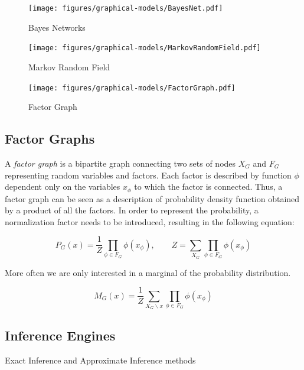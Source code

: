 \begin{figure}[ht]
    \begin{minipage}[b]{0.3\linewidth}
        \centering
        \texttt{[image: figures/graphical-models/BayesNet.pdf]}
        \caption{Bayes Networks}
    \end{minipage}
    \hspace{0.5cm}
    \begin{minipage}[b]{0.3\linewidth}
        \centering
        \texttt{[image: figures/graphical-models/MarkovRandomField.pdf]}
        \caption{Markov Random Field}
    \end{minipage}
    \hspace{0.5cm}
    \begin{minipage}[b]{0.3\linewidth}
        \centering
        \texttt{[image: figures/graphical-models/FactorGraph.pdf]}
        \caption{Factor Graph}
    \end{minipage}
\end{figure}

\subsection{Factor Graphs}
A \emph{factor graph} is a bipartite graph connecting two sets of nodes $X_G$ and $F_G$
representing random variables and factors.
Each factor is described by function $\phi$ dependent only on the variables $x_\phi$
to which the factor is connected.
Thus, a factor graph can be seen as a description of probability density function obtained
by a product of all the factors. In order to represent the probability,
a normalization factor needs to be introduced, resulting in the following equation:

\begin{equation}
P_G(x) = \frac{1}{Z}\prod_{\phi \in F_G}{\phi(x_{\phi})},\qquad
Z = \sum_{X_G}\prod_{\phi \in F_G}{\phi(x_{\phi})}
\end{equation}


More often we are only interested in a marginal of the probability distribution.

\begin{equation}
M_G(x) = \frac{1}{Z}\sum_{X_G \backslash x}{\prod_{\phi \in F_G}{\phi(x_{\phi})}}
\end{equation}

\subsection{Inference Engines}
Exact Inference and Approximate Inference methods


